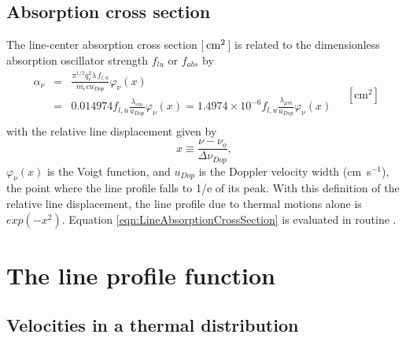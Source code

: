 \subsection{Absorption cross section}

The line-center absorption cross section [$\mbox{${\rm\thinspace cm}^{2}\,$}$] is related to the
dimensionless absorption oscillator strength $f_{lu}$ or $f_{abs}$ by
\begin{equation}
\label{eqn:LineAbsorptionCrossSection}
\begin{array}{ccl}
 {\alpha _\nu }& =& \frac{{{\pi ^{1/2}}q_e^2\lambda
\,{f_{l,u}}}}{{{m_e}c{u_{Dop}}}}{\varphi _\nu }(x) \\
& =& 0.014974{f_{l,u}}\frac{{{\lambda _{cm}}}}{{{u_{Dop}}}}{\varphi _\nu
}(x) = 1.4974 \times {10^{ - 6}}{f_{l,u}}\frac{{{\lambda _{\mu
m}}}}{{{u_{Dop}}}}{\varphi _\nu }(x) \\
 \end{array}
\quad [\mathrm{cm}^2]
\end{equation}
with the relative line displacement given by
\begin{equation}
\label{eqn:RelativelineDisplacement}
x \equiv \frac{{\nu  - {\nu _o}}}{{\Delta {\nu _{Dop}}}} ,
\end{equation}
${\varphi _\nu }\left( x \right)$
is the Voigt function, and $u_{Dop}$ is the Doppler velocity width
(cm~s$^{-1}$), the
point where the line profile falls to 1/e of its peak.
With this definition
of the relative line displacement, the line profile due to thermal motions
alone is $exp(-x^2)$.
Equation \ref{eqn:LineAbsorptionCrossSection} is evaluated
in routine .

\section{The line profile function}

\subsection{Velocities in a thermal distribution}

